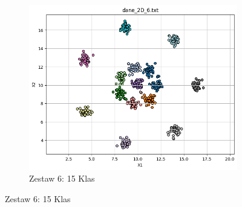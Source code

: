 \documentclass[polish,12pt,a4paper]{extarticle}
\begin{document}
\begin{figure}[h!]
    \hfill
    \begin{subfigure}[b]{0.30\textwidth}
        \includegraphics[width=\linewidth]{img/spectral/singular/data6.png}
        \captionsetup{labelformat=empty}
        \caption{Zestaw 6: 15 Klas}
    \end{subfigure}
    \hfill
\end{figure}
\end{document}
